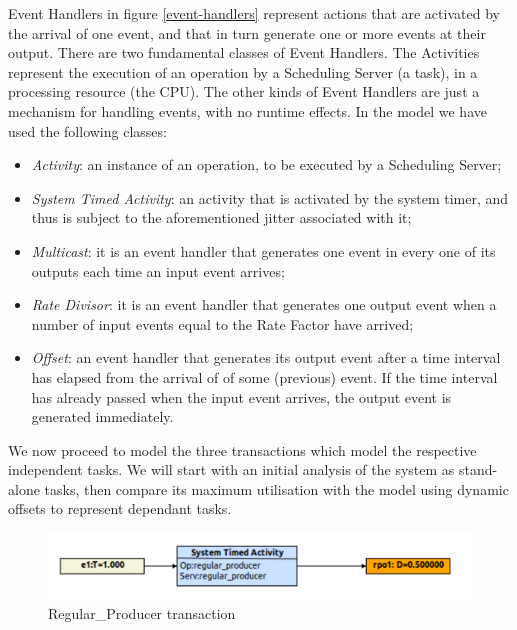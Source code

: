 \documentclass{article}
\begin{document}
Event Handlers in figure \ref{event-handlers} represent actions that are activated by the arrival of one event, and that in turn generate one or more events at their output. There are two fundamental classes of Event Handlers. The Activities represent the execution of an operation by a Scheduling Server (a task), in a processing resource (the CPU). The other kinds of Event Handlers are just a mechanism for handling events, with no runtime effects. In the model we have used the following classes:

\begin{itemize}
   \item \textit{Activity}: an instance of an operation, to be executed by a Scheduling Server;
   \item \textit{System Timed Activity}: an activity that is activated by the system timer, and thus is subject to the aforementioned jitter associated with it;
   \item \textit{Multicast}: it is an event handler that generates one event in every one of its outputs each time an input event arrives;
   \item \textit{Rate Divisor}: it is an event handler that generates one output event when a number of input events equal to the Rate Factor have arrived;
   \item \textit{Offset}: an event handler that generates its output event after a time interval has elapsed from the arrival of of some (previous) event. If the time interval has already passed when the input event arrives, the output event is generated immediately.
\end{itemize}

We now proceed to model the three transactions which model the respective independent tasks. We will start with an initial analysis of the system as stand-alone tasks, then compare its maximum utilisation with the model using dynamic offsets to represent dependant tasks.

\begin{figure}[!htbp]
\centering
\includegraphics[width=5in]{images/transaction-rp}
\caption{Regular\_Producer transaction}
\label{transaction-rp}
\end{figure}
\end{document}
